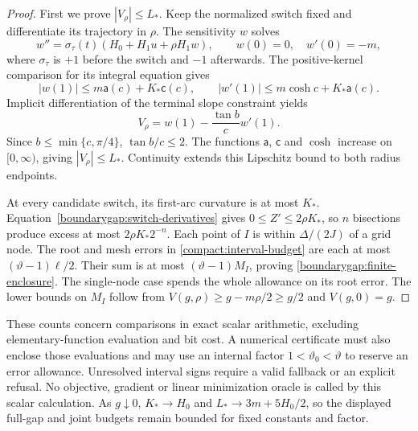 \begin{proof}
First we prove $|V_\rho|\le L_*$. Keep the normalized switch fixed
and differentiate its trajectory in $\rho$. The sensitivity $w$ solves
\[
 w''=\sigma_\tau(t)(H_0+H_1u+\rho H_1w),
 \qquad w(0)=0,\quad w'(0)=-m,
\]
where $\sigma_\tau$ is $+1$ before the switch and $-1$ afterwards.
The positive-kernel comparison for its integral equation gives
\[
 |w(1)|\le m\mathsf a(c)+K_*\mathsf c(c),\qquad
 |w'(1)|\le m\cosh c+K_*\mathsf a(c).
\]
Implicit differentiation of the terminal slope constraint yields
\begin{equation}\label{boundarygap:rho-derivative}
 V_\rho=w(1)-\frac{\tan b}{c}w'(1).
\end{equation}
Since $b\le\min\{c,\pi/4\}$, $\tan b/c\le2$.
The functions $\mathsf a$, $\mathsf c$ and $\cosh$ increase on
$[0,\infty)$, giving $|V_\rho|\le L_*$.
Continuity extends this Lipschitz bound to both radius endpoints.

At every candidate switch, its first-arc curvature is at most $K_*$.
Equation~\eqref{boundarygap:switch-derivatives} gives
$0\le Z'\le2\rho K_*$, so $n$ bisections produce excess at most
$2\rho K_*2^{-n}$. Each point of $I$ is within $\Delta/(2J)$ of
a grid node. The root and mesh errors in
\eqref{compact:interval-budget} are each at most
$(\vartheta-1)\ell/2$. Their sum is at most
$(\vartheta-1)M_I$, proving \eqref{boundarygap:finite-enclosure}.
The single-node case spends the whole allowance on its root error.
The lower bounds on $M_I$ follow from
$V(g,\rho)\ge g-m\rho/2\ge g/2$ and $V(g,0)=g$.
\end{proof}

These counts concern comparisons in exact scalar arithmetic, excluding
elementary-function evaluation and bit cost. A numerical certificate
must also enclose those evaluations and may use an internal factor
$1<\vartheta_0<\vartheta$ to reserve an error allowance. Unresolved
interval signs require a valid fallback or an explicit refusal.
No objective, gradient or linear minimization oracle is called by this
scalar calculation. As $g\downarrow0$, $K_*\to H_0$ and
$L_*\to3m+5H_0/2$, so the displayed full-gap and joint budgets remain
bounded for fixed constants and factor.

